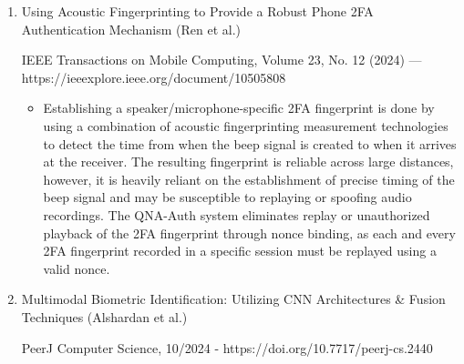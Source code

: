 \begin{enumerate}
\begin{itemize}
\item Using a contrastive-based learning framework with matching sets of positive and negative signals can generate device embeddings that are invariant to the domain (e.g., the type of RF signal). When compared to traditional approaches using supervised learning, unsupervised contrastive-based learning improves accuracy by 10 to 28\% when tested with temporal domain shifts. This study only considered RF signals, and it will take additional work before the methodology can be applied cumulatively to account for noise from both a visual camera and analog microphone.
\item The QNA-Auth approach also utilizes the contrastive-based learning framework through a siamese-like architecture, implementing a physical measurement-based biometric for a two-factor authentication system.
\end{itemize}

\item Using Acoustic Fingerprinting to Provide a Robust Phone 2FA Authentication Mechanism (Ren et al.)

IEEE Transactions on Mobile Computing, Volume 23, No. 12 (2024) — https://ieeexplore.ieee.org/document/10505808

\begin{itemize}
\item Establishing a speaker/microphone-specific 2FA fingerprint is done by using a combination of acoustic fingerprinting measurement technologies to detect the time from when the beep signal is created to when it arrives at the receiver. The resulting fingerprint is reliable across large distances, however, it is heavily reliant on the establishment of precise timing of the beep signal and may be susceptible to replaying or spoofing audio recordings. The QNA-Auth system eliminates replay or unauthorized playback of the 2FA fingerprint through nonce binding, as each and every 2FA fingerprint recorded in a specific session must be replayed using a valid nonce.
\end{itemize}

\item Multimodal Biometric Identification: Utilizing CNN Architectures \& Fusion Techniques (Alshardan et al.)

PeerJ Computer Science, 10/2024 - https://doi.org/10.7717/peerj-cs.2440


\end{enumerate}
